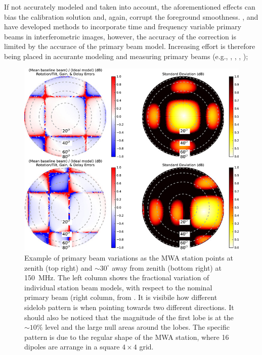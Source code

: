 \begin{itemize}
If not accurately modeled and taken into account, the aforementioned effects can bias the calibration solution and, again, corrupt the foreground smoothness. \cite{sullivan2009}, \cite{tasse13} and \cite{bhatnagar12} have developed methods to incorporate time and frequency variable primary beams in interferometric images, however, the accuracy of the correction is limited by the accurace of the primary beam model. Increasing effort is therefore being placed in accurante modeling and measuring primary beams (e.g., \cite{pupillo15}, \cite{deleraacedo17}, \cite{jacobs17}, \cite{deleraacedo18});
\begin{figure}[]
\begin{center}
\includegraphics[width=1.\textwidth]{Bernardi/mwa_beams_err}
\end{center}
\caption{Example of primary beam variations as the MWA station points at zenith (top right) and $\sim 30^\circ$ away from zenith (bottom right) at 150~MHz. The left column shows the fractional variation of individual station beam models, with respect to the nominal primary beam (right column, from \cite{neben16}. It is visibile how different sidelob pattern is when pointing towards two different directions. It should also be noticed that the magnitude of the first lobe is at the $\sim 10\%$ level and the large null areas around the lobes. The specific pattern is due to the regular shape of the MWA station, where 16 dipoles are arrange in a square $4 \times 4$ grid.}
\label{fig:fig3}
\end{figure}



\end{itemize}

